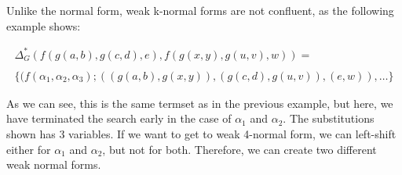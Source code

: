 \documentclass[a4paper, 11pt]{report}
\begin{document}





Unlike the normal form, weak k-normal forms are not confluent, as the following example shows:

$$
\begin{array}{l}
\Delta_G^*(f(g(a,b),g(c,d),e), f(g(x,y),g(u,v),w)) =\\
\\
\{(f(\alpha_1,\alpha_2,\alpha_3); ((g(a,b),g(x,y)), (g(c,d),g(u,v)), (e,w)),\dots \}
\end{array}
$$

As we can see, this is the same termset as in the previous example, but here, we have terminated the search early in the case of $\alpha_1$ and $\alpha_2$. The substitutions shown has 3 variables. If we want to get to weak 4-normal form, we can left-shift either for $\alpha_1$ and $\alpha_2$, but not for both. Therefore, we can create two different weak normal forms.



\end{document}

